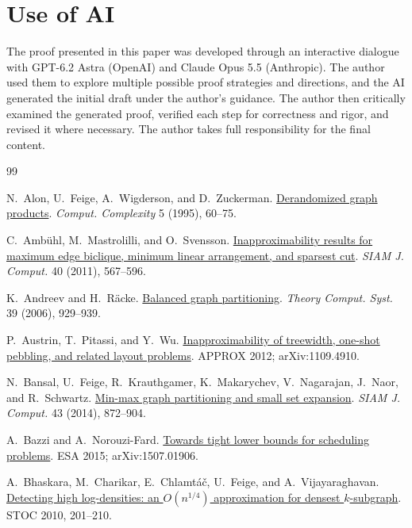 \documentclass[11pt,letterpaper]{article}
\theoremstyle{definition}
\theoremstyle{remark}
\begin{document}
\section*{Use of AI}
The proof presented in this paper was developed through an interactive
dialogue with GPT-6.2 Astra (OpenAI) and Claude Opus 5.5 (Anthropic).
The author used them to explore multiple possible proof strategies and
directions, and the AI generated the initial draft under the author's
guidance. The author then critically examined the generated proof,
verified each step for correctness and rigor, and revised it where
necessary. The author takes full responsibility for the final content.

\begin{thebibliography}{99}

N.~Alon, U.~Feige, A.~Wigderson, and D.~Zuckerman.
\href{https://www.math.ias.edu/avi/node/790}{Derandomized graph products}.
\emph{Comput. Complexity} 5 (1995), 60--75.

C.~Amb\"uhl, M.~Mastrolilli, and O.~Svensson.
\href{https://theory.epfl.ch/osven/Ola%20Svensson_publications/SICOMP11a.pdf}{Inapproximability results for maximum edge biclique, minimum linear arrangement, and sparsest cut}.
\emph{SIAM J. Comput.} 40 (2011), 567--596.

K.~Andreev and H.~R\"acke.
\href{https://www.cs.cmu.edu/~harry/pdf/bpartition.pdf}{Balanced graph partitioning}.
\emph{Theory Comput. Syst.} 39 (2006), 929--939.

P.~Austrin, T.~Pitassi, and Y.~Wu.
\href{https://arxiv.org/abs/1109.4910}{Inapproximability of treewidth, one-shot pebbling, and related layout problems}.
APPROX 2012; arXiv:1109.4910.

N.~Bansal, U.~Feige, R.~Krauthgamer, K.~Makarychev, V.~Nagarajan, J.~Naor, and R.~Schwartz.
\href{https://doi.org/10.1137/120873996}{Min-max graph partitioning and small set expansion}.
\emph{SIAM J. Comput.} 43 (2014), 872--904.

A.~Bazzi and A.~Norouzi-Fard.
\href{https://arxiv.org/abs/1507.01906}{Towards tight lower bounds for scheduling problems}.
ESA 2015; arXiv:1507.01906.

A.~Bhaskara, M.~Charikar, E.~Chlamt\'a\v{c}, U.~Feige, and A.~Vijayaraghavan.
\href{https://users.cs.northwestern.edu/~aravindv/DkS.pdf}{Detecting high log-densities: an \(O(n^{1/4})\) approximation for densest \(k\)-subgraph}.
STOC 2010, 201--210.


\end{thebibliography}
\end{document}
